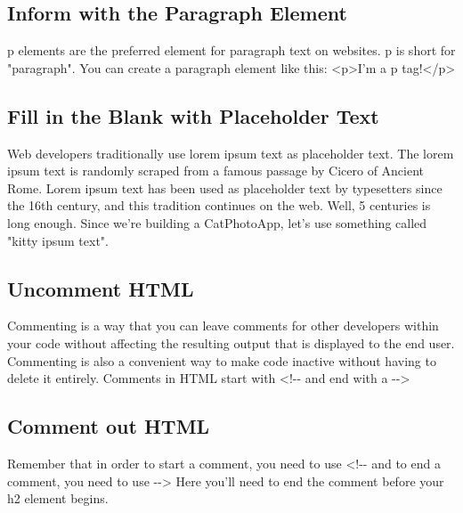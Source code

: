\documentclass{article}%
\begin{document}
%
\subsection{Inform with the Paragraph Element}%
\label{subsec:InformwiththeParagraphElement}%
p elements are the preferred element for paragraph text on websites. p is short for "paragraph".\newline%
You can create a paragraph element like this:\newline%
<p>I'm a p tag!</p>\newline%

%
\subsection{Fill in the Blank with Placeholder Text}%
\label{subsec:FillintheBlankwithPlaceholderText}%
Web developers traditionally use lorem ipsum text as placeholder text. The lorem ipsum text is randomly scraped from a famous passage by Cicero of Ancient Rome.\newline%
Lorem ipsum text has been used as placeholder text by typesetters since the 16th century, and this tradition continues on the web.\newline%
Well, 5 centuries is long enough. Since we're building a CatPhotoApp, let's use something called "kitty ipsum text".\newline%

%
\subsection{Uncomment HTML}%
\label{subsec:UncommentHTML}%
Commenting is a way that you can leave comments for other developers within your code without affecting the resulting output that is displayed to the end user.\newline%
Commenting is also a convenient way to make code inactive without having to delete it entirely.\newline%
Comments in HTML start with <!{-}{-} and end with a {-}{-}>\newline%

%
\subsection{Comment out HTML}%
\label{subsec:CommentoutHTML}%
Remember that in order to start a comment, you need to use <!{-}{-} and to end a comment, you need to use {-}{-}>\newline%
Here you'll need to end the comment before your h2 element begins.\newline%
\end{document}
